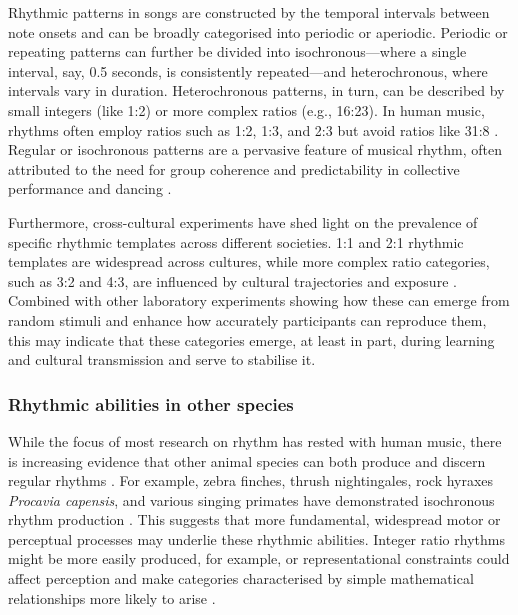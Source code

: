 Rhythmic patterns in songs are constructed by the temporal intervals between note onsets and can be broadly categorised into periodic or aperiodic. Periodic or repeating patterns can further be divided into isochronous---where a single interval, say, 0.5 seconds, is consistently repeated---and heterochronous, where intervals vary in duration. Heterochronous patterns, in turn, can be described by small integers (like 1:2) or more complex ratios (e.g., 16:23). In human music, rhythms often employ ratios such as 1:2, 1:3, and 2:3 but avoid ratios like 31:8 \autocite{ravignani2014}. Regular or isochronous patterns are a pervasive feature of musical rhythm, often attributed to the need for group coherence and predictability in collective performance and dancing \autocite{kotz2018}. 

Furthermore, cross-cultural experiments have shed light on the prevalence of specific rhythmic templates across different societies. 1:1 and 2:1 rhythmic templates are widespread across cultures, while more complex ratio categories, such as 3:2 and 4:3, are influenced by cultural trajectories and exposure \autocite{polak2018, jacoby2017a, jacoby2021}. Combined with other laboratory experiments \autocite{ravignani2017a} showing how these can emerge from random stimuli and enhance how accurately participants can reproduce them, this may indicate that these categories emerge, at least in part, during learning and cultural transmission and serve to stabilise it.

\subsubsection{Rhythmic abilities in other species}
While the focus of most research on rhythm has rested with human music, there is increasing evidence that other animal species can both produce and discern regular rhythms \autocite{rouse2021, verga2022, vanderaa2015}. For example, zebra finches, thrush nightingales, rock hyraxes \textit{Procavia capensis}, and various singing primates have demonstrated isochronous rhythm production \autocite{roeske2020, norton2016, demartsev2023, degregorio2021, degregorio2023, raimondi2023}. This suggests that more fundamental, widespread motor or perceptual processes may underlie these rhythmic abilities. Integer ratio rhythms might be more easily produced, for example, or representational constraints could affect perception and make categories characterised by simple mathematical relationships more likely to arise \autocite{ravignani2018c, roeske2020, jacoby2017a}.


